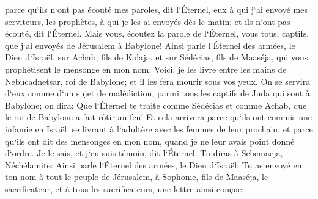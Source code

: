 \verse parce qu`ils n`ont pas écouté mes paroles, dit l`Éternel, eux à qui j`ai envoyé mes serviteurs, les prophètes, à qui je les ai envoyés dès le matin; et ils n`ont pas écouté, dit l`Éternel. 
\verse Mais vous, écoutez la parole de l`Éternel, vous tous, captifs, que j`ai envoyés de Jérusalem à Babylone! 
\verse Ainsi parle l`Éternel des armées, le Dieu d`Israël, sur Achab, fils de Kolaja, et sur Sédécias, fils de Maaséja, qui vous prophétisent le mensonge en mon nom: Voici, je les livre entre les mains de Nebucadnetsar, roi de Babylone; et il les fera mourir sous vos yeux. 
\verse On se servira d`eux comme d`un sujet de malédiction, parmi tous les captifs de Juda qui sont à Babylone; on dira: Que l`Éternel te traite comme Sédécias et comme Achab, que le roi de Babylone a fait rôtir au feu! 
\verse Et cela arrivera parce qu`ils ont commis une infamie en Israël, se livrant à l`adultère avec les femmes de leur prochain, et parce qu`ils ont dit des mensonges en mon nom, quand je ne leur avais point donné d`ordre. Je le sais, et j`en suis témoin, dit l`Éternel. 
\verse Tu diras à Schemaeja, Néchélamite: 
\verse Ainsi parle l`Éternel des armées, le Dieu d`Israël: Tu as envoyé en ton nom à tout le peuple de Jérusalem, à Sophonie, fils de Maaséja, le sacrificateur, et à tous les sacrificateurs, une lettre ainsi conçue: 
